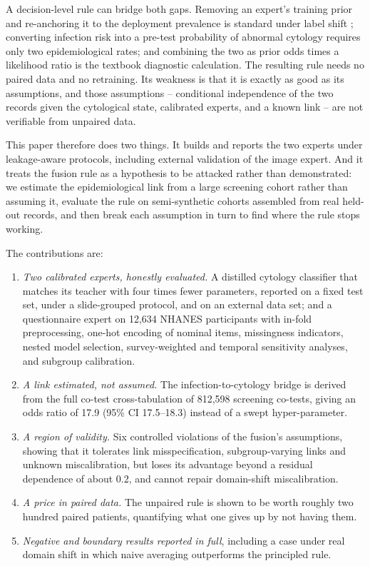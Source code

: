 \documentclass[lettersize,journal]{IEEEtran}
\begin{document}
A decision-level rule can bridge both gaps. Removing an expert's training prior and re-anchoring it to the deployment prevalence is standard under label shift \cite{saerens2002adjusting,lipton2018labelshift}; converting infection risk into a pre-test probability of abnormal cytology requires only two epidemiological rates; and combining the two as prior odds times a likelihood ratio is the textbook diagnostic calculation. The resulting rule needs no paired data and no retraining. Its weakness is that it is exactly as good as its assumptions, and those assumptions -- conditional independence of the two records given the cytological state, calibrated experts, and a known link -- are not verifiable from unpaired data.

This paper therefore does two things. It builds and reports the two experts under leakage-aware protocols, including external validation of the image expert. And it treats the fusion rule as a hypothesis to be attacked rather than demonstrated: we estimate the epidemiological link from a large screening cohort rather than assuming it, evaluate the rule on semi-synthetic cohorts assembled from real held-out records, and then break each assumption in turn to find where the rule stops working.

The contributions are:
\begin{enumerate}
\item \emph{Two calibrated experts, honestly evaluated.} A distilled cytology classifier that matches its teacher with four times fewer parameters, reported on a fixed test set, under a slide-grouped protocol, and on an external data set; and a questionnaire expert on 12,634 NHANES participants with in-fold preprocessing, one-hot encoding of nominal items, missingness indicators, nested model selection, survey-weighted and temporal sensitivity analyses, and subgroup calibration.
\item \emph{A link estimated, not assumed.} The infection-to-cytology bridge is derived from the full co-test cross-tabulation of 812,598 screening co-tests, giving an odds ratio of 17.9 (95\% CI 17.5--18.3) instead of a swept hyper-parameter.
\item \emph{A region of validity.} Six controlled violations of the fusion's assumptions, showing that it tolerates link misspecification, subgroup-varying links and unknown miscalibration, but loses its advantage beyond a residual dependence of about 0.2, and cannot repair domain-shift miscalibration.
\item \emph{A price in paired data.} The unpaired rule is shown to be worth roughly two hundred paired patients, quantifying what one gives up by not having them.
\item \emph{Negative and boundary results reported in full}, including a case under real domain shift in which naive averaging outperforms the principled rule.
\end{enumerate}
\end{document}
